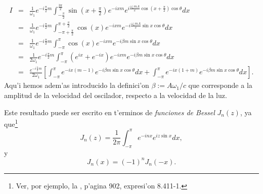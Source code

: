 \begin{eqnarray}
I&=&\frac{1}{\omega_1}e^{-i\frac{\pi}{2}m}\int_{-\frac{\pi}{2}}^{\frac{3\pi}{2}}
\sin\left(x+\frac{\pi}{2}\right)  e^{-ixm}e^{i\frac{\omega_1mA}{c}\cos\left(
x+\frac{\pi}{2}\right)  \cos\theta}dx \\
&=&\frac{1}{\omega_1}e^{-i\frac{\pi}{2}m}\int_{-\pi+\frac{\pi}{2}}^{\pi+\frac{\pi
}{2}}\cos(x)e^{-ixm}e^{-i\frac{\omega_1mA}{c}\sin x\cos\theta}dx\\
&=&\frac{1}{\omega_1}e^{-i\frac{\pi}{2}m}\int_{-\pi}^{\pi}\cos(x)
e^{-ixm}e^{-i\beta m\sin x\cos\theta}dx\\
&=&\frac{1}{2\omega_1}e^{-i\frac{\pi}{2}m}\int_{-\pi}^{\pi}\left(
e^{ix}+e^{-ix}\right)e^{-ixm}e^{-i\beta m\sin x\cos\theta}dx\\
&=&\frac{e^{-i\frac{\pi}{2}m}}{2\omega_1}\left[\int_{-\pi}^{\pi}e^{-ix\left(
m-1\right)}e^{-i\beta m\sin x\cos\theta}dx+\int_{-\pi}^{\pi}e^{-ix\left(
1+m\right)}e^{-i\beta m\sin x\cos\theta}dx\right]  .
\end{eqnarray}
Aqu'i hemos adem'as introducido la definici'on $\beta:={A\omega_1}/{c}$ que
corresponde a la amplitud de la velocidad del oscilador, respecto a la velocidad
de la luz.

Este resultado puede ser escrito en t'erminos de \textit{funciones de Bessel}
$J_n(z)$, ya que\footnote{Ver, por ejemplo, la \cite{GR00}, p'agina
902, expresi'on 8.411-1.}
\begin{equation}
J_{n}(z)  =\frac{1}{2\pi}\int_{-\pi}^{\pi}e^{-inx}e^{iz\sin x}dx ,
\end{equation}
y
\begin{equation}
 J_n(x)=(-1)^nJ_n(-x).
\end{equation}

